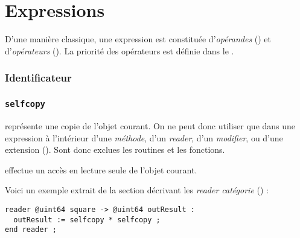 
\chapter{Expressions}

D'une manière classique, une expression est constituée d'\emph{opérandes} () et d'\emph{opérateurs} (). La priorité des opérateurs est définie dans le .





\subsection{Identificateur}

\subsection{\texttt{selfcopy}}

 représente une copie de l'objet courant. On ne peut donc utiliser  que dans une expression à l'intérieur d'une \emph{méthode}, d'un \emph{reader}, d'un \emph{modifier}, ou d'une extension (). Sont donc exclues les routines et les fonctions.

 effectue un accès en lecture seule de l'objet courant. 

Voici un exemple extrait de la section décrivant les \emph{reader catégorie} () :
\begin{lstlisting}[language=galgas]
reader @uint64 square -> @uint64 outResult :
  outResult := selfcopy * selfcopy ;
end reader ;
\end{lstlisting}










